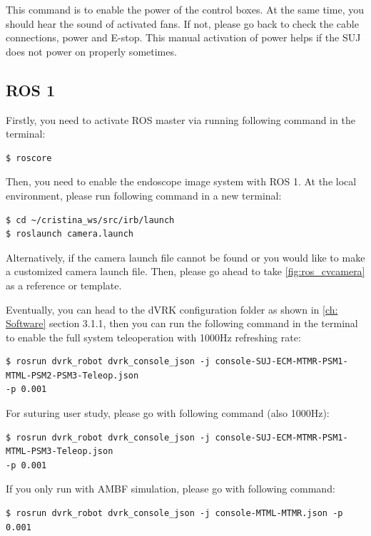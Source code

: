 This command is to enable the power of the control boxes. At the same time, you should hear the sound of activated fans. If not, please go back to check the cable connections, power and E-stop. This manual activation of power helps if the SUJ does not power on properly sometimes.

\subsection{ROS 1}

Firstly, you need to activate ROS master via running following command in the terminal:

\begin{verbatim}
$ roscore
\end{verbatim}

Then, you need to enable the endoscope image system with ROS 1. At the local environment, please run following command in a new terminal:

\begin{verbatim}
$ cd ~/cristina_ws/src/irb/launch
$ roslaunch camera.launch
\end{verbatim}

Alternatively, if the camera launch file cannot be found or you would like to make a customized camera launch file. Then, please go ahead to take \autoref{fig:ros_cvcamera} as a reference or template.

Eventually, you can head to the dVRK configuration folder as shown in \autoref{ch: Software} section 3.1.1, then you can run the following command in the terminal to enable the full system teleoperation with 1000Hz refreshing rate:

\begin{verbatim}
$ rosrun dvrk_robot dvrk_console_json -j console-SUJ-ECM-MTMR-PSM1-MTML-PSM2-PSM3-Teleop.json
-p 0.001
\end{verbatim}

For suturing user study, please go with following command (also 1000Hz):

\begin{verbatim}
$ rosrun dvrk_robot dvrk_console_json -j console-SUJ-ECM-MTMR-PSM1-MTML-PSM3-Teleop.json
-p 0.001
\end{verbatim}

If you only run with AMBF simulation, please go with following command:

\begin{verbatim}
$ rosrun dvrk_robot dvrk_console_json -j console-MTML-MTMR.json -p 0.001
\end{verbatim}

